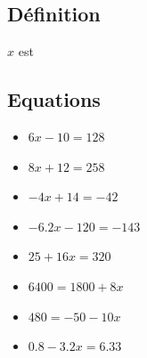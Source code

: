 \subsection*{Définition}

$x$ est \dotfill \\ \Pointilles[1]

\subsection*{Equations}


\begin{multicols}{2}
\begin{itemize}[label={$\bullet$}]
\item $6x - 10 = 128$ \\ \Pointilles[10]  \columnbreak 
\item $8x + 12 = 258$ \\ \Pointilles[10]
\end{itemize} 
\end{multicols}

\begin{multicols}{2}
  \begin{itemize}[label={$\bullet$}]
\item $-4x + 14 = -42$ \\ \Pointilles[10]  \columnbreak 
\item $-6.2x - 120 = -143$ \\ \Pointilles[10]
\end{itemize} 
\end{multicols}

\begin{multicols}{2}
  \begin{itemize}[label={$\bullet$}]
\item $25 + 16x = 320 $ \\ \Pointilles[10]  \columnbreak 
\item $6400 = 1800 + 8x$ \\ \Pointilles[10]
\end{itemize} 
\end{multicols}

\begin{multicols}{2}
  \begin{itemize}[label={$\bullet$}]
\item $480 = -50 - 10x$ \\ \Pointilles[10]  \columnbreak 
\item $0.8 - 3.2x = 6.33$ \\ \Pointilles[10]
\end{itemize} 
\end{multicols}

